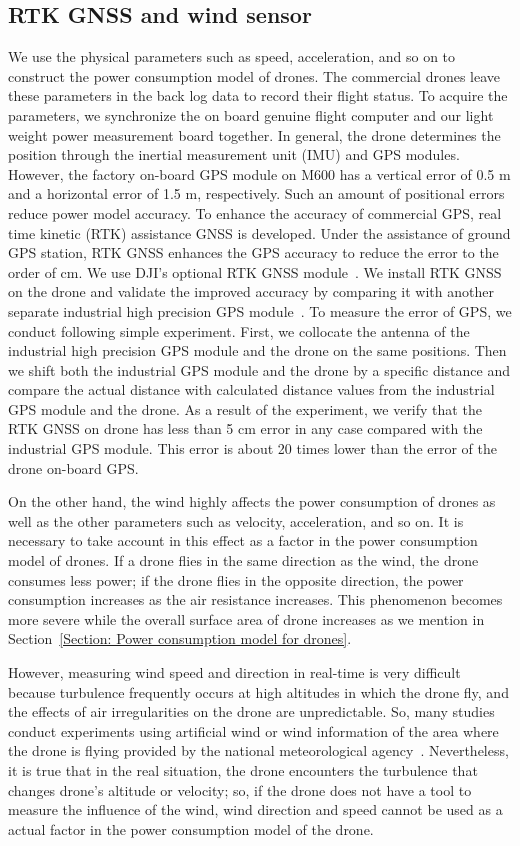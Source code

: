 \documentclass[journal]{./template/IEEEtran}
\begin{document}
\subsection{RTK GNSS and wind sensor}
We use the physical parameters such as speed, acceleration, and so on to construct the power consumption model of drones.
The commercial drones leave these parameters in the back log data to record their flight status.
To acquire the parameters, we synchronize the on board genuine flight computer and our light weight power measurement board together. In general, the drone determines the position through the inertial measurement unit (IMU) and GPS modules. 
However, the factory on-board GPS module on M600 has a vertical error of 0.5 m and a horizontal error of 1.5 m, respectively. 
Such an amount of positional errors reduce power model accuracy.
To enhance the accuracy of commercial GPS, real time kinetic (RTK) assistance GNSS is developed. Under the assistance of ground GPS station, RTK GNSS enhances the GPS accuracy to reduce the error to the order of cm. We use DJI's optional RTK GNSS module~\cite{ref_13}.
We install RTK GNSS on the drone and validate the improved accuracy by comparing it with another separate industrial high precision GPS module~\cite{ref_14}.
To measure the error of GPS, we conduct following simple experiment. First, we collocate the antenna of the industrial high precision GPS module and the drone on the same positions. Then we shift both the industrial GPS module and the drone by a specific distance and compare the actual distance with calculated distance values from the industrial GPS module and the drone.
As a result of the experiment, we verify that the RTK GNSS on drone has less than 5 cm error in any case compared with the industrial GPS module. This error is about 20 times lower than the error of the drone on-board GPS.

On the other hand, the wind highly affects the power consumption of drones as well as the other parameters such as velocity, acceleration, and so on.
It is necessary to take account in this effect as a factor in the power consumption model of drones. 
If a drone flies in the same direction as the wind, the drone consumes less power; if the drone flies in the opposite direction, the power consumption increases as the air resistance increases. 
This phenomenon becomes more severe while the overall surface area of drone increases as we mention in Section~\ref{Section: Power consumption model for drones}.

However, measuring wind speed and direction in real-time is very difficult because turbulence frequently occurs at high altitudes in which the drone fly, and the effects of air irregularities on the drone are unpredictable.
So, many studies conduct experiments using artificial wind or wind information of the area where the drone is flying provided by the national meteorological agency~\cite{ref_5,ref_9}. 
Nevertheless, it is true that in the real situation, the drone encounters the turbulence that changes drone's altitude or velocity; so, if the drone does not have a tool to measure the influence of the wind, wind direction and speed cannot be used as a actual factor in the power consumption model of the drone. 
\end{document}

